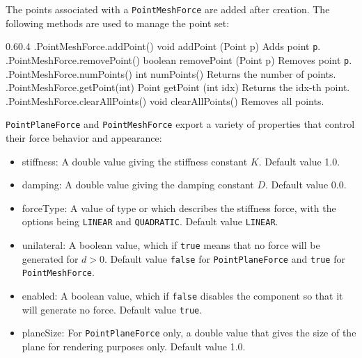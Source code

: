 The points associated with a {\tt PointMeshForce} are added after
creation. The following methods are used to manage the point set:
%
\begin{methodtable}{0.6}{0.4}
\midline
%
\methodentry
{\mech.PointMeshForce.addPoint()}%
{void addPoint (Point p)}%
{Adds point {\tt p}.}%
%
\methodentry
{\mech.PointMeshForce.removePoint()}%
{boolean removePoint (Point p)}%
{Removes point {\tt p}.}%
%
\methodentry
{\mech.PointMeshForce.numPoints()}%
{int numPoints()}%
{Returns the number of points.}%
%
\methodentry
{\mech.PointMeshForce.getPoint(int)}%
{Point getPoint (int idx)}%
{Returns the idx-th point.}%
%
\methodentry
{\mech.PointMeshForce.clearAllPoints()}%
{void clearAllPoints()}%
{Removes all points.}%
%
\midline
\end{methodtable}
%

{\tt PointPlaneForce} and {\tt PointMeshForce} export a variety of properties
that control their force behavior and appearance:

\begin{itemize}

\item {\sf stiffness}: A double value giving the stiffness constant $K$.
Default value 1.0.

\item {\sf damping}: A double value giving the damping constant $D$.
Default value 0.0.

\item {\sf forceType}: A value of type
 or
which describes the
stiffness force, with the options being {\tt LINEAR} and {\tt QUADRATIC}.
Default value {\tt LINEAR}.

\item {\sf unilateral}: A boolean value, which if {\tt true} means
that no force will be generated for $d > 0$.  Default value {\tt false} for
{\tt PointPlaneForce} and {\tt true} for {\tt PointMeshForce}.

\item {\sf enabled}: A boolean value, which if {\tt false} disables
the component so that it will generate no force. Default value {\tt true}.

\item {\sf planeSize}: For {\tt PointPlaneForce} only, a double value 
that gives the size of the plane for rendering purposes only.
Default value 1.0.

\end{itemize}

